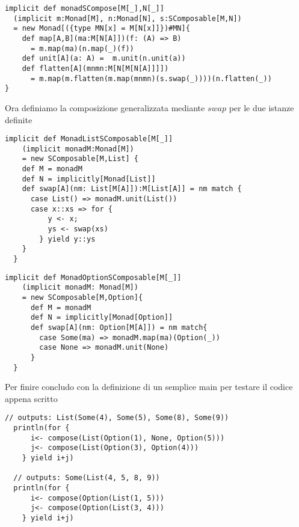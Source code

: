 \begin{lstlisting}[style=myScalastyle, caption=SComposable is Monad]
implicit def monadSCompose[M[_],N[_]]
  (implicit m:Monad[M], n:Monad[N], s:SComposable[M,N])
  = new Monad[({type MN[x] = M[N[x]]})#MN]{
    def map[A,B](ma:M[N[A]])(f: (A) => B)
      = m.map(ma)(n.map(_)(f))
    def unit[A](a: A) =  m.unit(n.unit(a))
    def flatten[A](mnmn:M[N[M[N[A]]]])
      = m.map(m.flatten(m.map(mnmn)(s.swap(_))))(n.flatten(_))
}
\end{lstlisting}

Ora definiamo la composizione generalizzata mediante $swap$ per le due istanze
definite
\begin{lstlisting}[style=myScalastyle, caption=Composing List]
  implicit def MonadListSComposable[M[_]]
    (implicit monadM:Monad[M])
    = new SComposable[M,List] {
    def M = monadM
    def N = implicitly[Monad[List]]
    def swap[A](nm: List[M[A]]):M[List[A]] = nm match {
      case List() => monadM.unit(List())
      case x::xs => for {
          y <- x;
          ys <- swap(xs)
        } yield y::ys
    }
  }
\end{lstlisting}
\pagebreak
\begin{lstlisting}[style=myScalastyle, caption=Composing Optional]
  implicit def MonadOptionSComposable[M[_]]
    (implicit monadM: Monad[M])
    = new SComposable[M,Option]{
      def M = monadM
      def N = implicitly[Monad[Option]]
      def swap[A](nm: Option[M[A]]) = nm match{
        case Some(ma) => monadM.map(ma)(Option(_))
        case None => monadM.unit(None)
      }
  }
\end{lstlisting}

Per finire concludo con la definizione di un semplice main per testare il codice
appena scritto
\begin{lstlisting}[style=myScalastyle, caption=Main]
  // outputs: List(Some(4), Some(5), Some(8), Some(9))
  println(for {
      i<- compose(List(Option(1), None, Option(5)))
      j<- compose(List(Option(3), Option(4)))
    } yield i+j)

  // outputs: Some(List(4, 5, 8, 9))
  println(for {
      i<- compose(Option(List(1, 5)))
      j<- compose(Option(List(3, 4)))
    } yield i+j)
\end{lstlisting}
